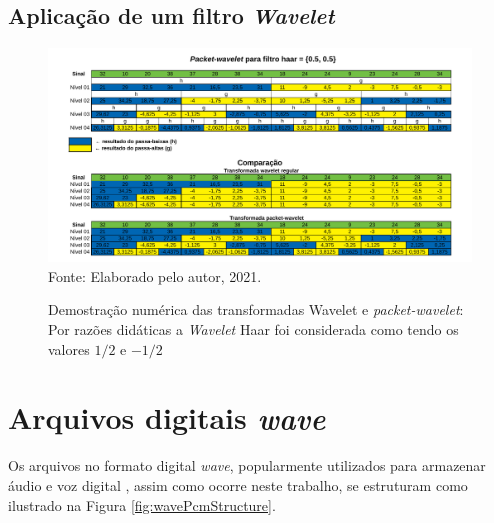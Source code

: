 \begin{apendicesenv}
	\partapendices
	\begin{landscape}
		\chapter{Aplicação de um filtro \textit{Wavelet}}
		\begin{figure}[h]
			\caption{Demostração numérica das transformadas Wavelet e \textit{packet-wavelet}: Por razões didáticas a \textit{Wavelet} Haar foi considerada como tendo os valores $1/2$ e $-1/2$}
			\includegraphics[width=.93\linewidth]{images/haarWaveletExamples.pdf}
			\label{fig:haarWaveletExamples}
			\\Fonte: Elaborado pelo autor, 2021.
			
		\end{figure}
	\end{landscape}

	\chapter{Arquivos digitais \textit{wave}}
		\label{chap:waveFile}
		\par Os arquivos no formato digital \textit{wave}, popularmente utilizados para armazenar áudio e voz digital \cite{WAVE2019}, assim como ocorre neste trabalho, se estruturam como ilustrado na Figura \ref{fig:wavePcmStructure}.
		

\end{apendicesenv}
